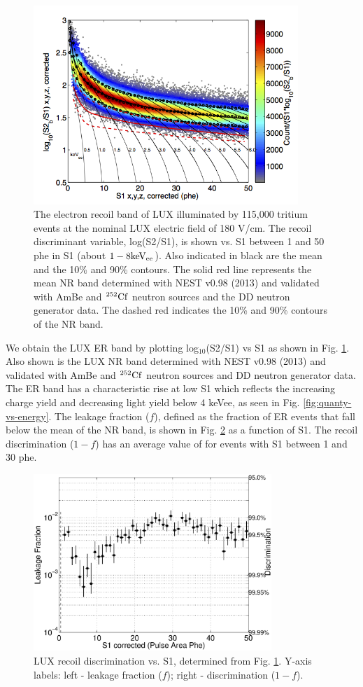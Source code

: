\begin{figure}[h!]\centering
\includegraphics[width=100mm]{fig/CH3T_fid_50_2_Dec_Tritium_Approval_Plots.png}
\caption{The electron recoil band of LUX illuminated by 115,000 tritium events at the nominal LUX electric field of 180 V/cm.  The recoil discriminant variable, log(S2/S1), is shown vs. S1 between 1 and 50 phe in S1 (about $\rm1-8 keV_{ee}$). Also indicated in black are the mean and the 10\% and 90\% contours. The solid red line represents the mean NR band determined with NEST v0.98 (2013) \cite{nest} and validated with AmBe and $\rm^{252}Cf$ neutron sources and the DD neutron generator data. The dashed red indicates the 10\% and 90\% contours of the NR band.}
\label{fig:ER_band}
\end{figure}

We obtain the LUX ER band by plotting log$_{10}$(S2/S1) vs S1 as shown in Fig. \ref{fig:ER_band}. Also shown is the LUX NR band determined with NEST v0.98 (2013) \cite{nest} and validated with AmBe and $\rm^{252}Cf$ neutron sources and DD neutron generator data. The ER band has a characteristic rise at low S1 which reflects the increasing charge yield and decreasing light yield below 4 keVee, as seen in Fig. \ref{fig:quanty-vs-energy}. The leakage fraction ($f$), defined as the fraction of ER events that fall below the mean of the NR band, is shown in Fig. \ref{fig:Leak} as a function of S1. The recoil discrimination ($1-f$) has an average value of  for events with S1 between 1 and 30 phe.


\begin{figure}[h!]\centering
\includegraphics[width=90mm]{fig/CH3T_Leakage_fid_50_Dec_Tritium_Approval_Plots_2.eps}
\caption{LUX recoil discrimination vs. S1, determined from Fig. \ref{fig:ER_band}. Y-axis labels: left -  leakage fraction ($f$); right - discrimination ($1-f$).}
\label{fig:Leak}
\end{figure}


